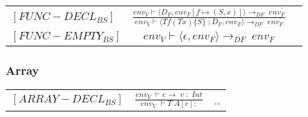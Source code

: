 \begin{semantik}
    \bgroup
    \def\arraystretch{3}
    \begin{table}[H]
    \centering
    \begin{tabular}{l c l}
        
        $[FUNC-DECL_{BS}]$ & $
        \frac{env_V \vdash \langle D_F, env_F[f \mapsto (S, x)] \rangle \rightarrow_{DF}\; env_F^\prime}
        {env_V \vdash \langle T f(T x) \{ S \}\; ; D_F, env_F \rangle \rightarrow_{DF}\; env_F^\prime}
        $ & \\
        
        $[FUNC-EMPTY_{BS}]$ & $
        env_V \vdash \langle \epsilon, env_F \rangle \rightarrow_{DF}\; env_F
        $
        
    \end{tabular}
    \end{table}
    \egroup
    \caption{Deklaration af funktioner}
    \label{sem:funktioner}
\end{semantik}



\subsubsection*{Array}

\begin{semantik}
    \bgroup
    \def\arraystretch{3}
    \begin{table}[H]
    \centering
    \begin{tabular}{l c l}
        
        $[ARRAY-DECL_{BS}]$ & $
        \frac{env_V\; \vdash e \rightarrow\; v\;:\;Int}
        {env_V\; \vdash T\; A[e];}
        $ & .. \\
        
    \end{tabular}
    \end{table}
    \egroup
    \caption{Deklaration af array}
    \label{sem:arraydecl}
\end{semantik}


\subsubsection*{}

\subsubsection*{}